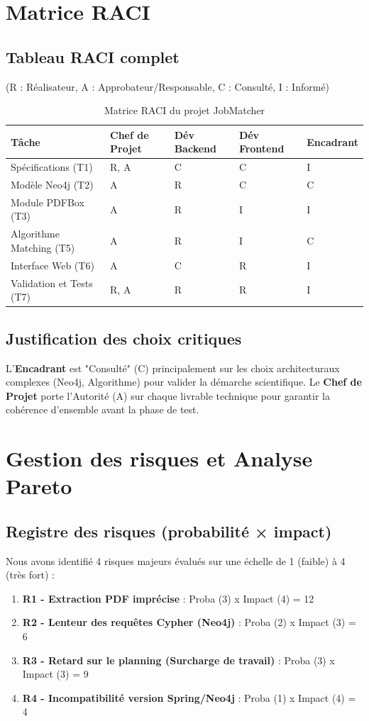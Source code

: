 \documentclass[12pt,a4paper]{report}
\begin{document}
\section{Matrice RACI}

\subsection{Tableau RACI complet}
(R : Réalisateur, A : Approbateur/Responsable, C : Consulté, I : Informé)

\begin{table}[h]
\centering
\begin{tabular}{|p{4cm}|p{2.5cm}|p{2.5cm}|p{2.5cm}|p{2.5cm}|}
\hline
\textbf{Tâche} & \textbf{Chef de Projet} & \textbf{Dév Backend} & \textbf{Dév Frontend} & \textbf{Encadrant} \\
\hline
Spécifications (T1) & R, A & C & C & I \\
\hline
Modèle Neo4j (T2) & A & R & C & C \\
\hline
Module PDFBox (T3) & A & R & I & I \\
\hline
Algorithme Matching (T5) & A & R & I & C \\
\hline
Interface Web (T6) & A & C & R & I \\
\hline
Validation et Tests (T7) & R, A & R & R & I \\
\hline
\end{tabular}
\caption{Matrice RACI du projet JobMatcher}
\end{table}

\subsection{Justification des choix critiques}
L'\textbf{Encadrant} est "Consulté" (C) principalement sur les choix architecturaux complexes (Neo4j, Algorithme) pour valider la démarche scientifique. Le \textbf{Chef de Projet} porte l'Autorité (A) sur chaque livrable technique pour garantir la cohérence d'ensemble avant la phase de test.

\section{Gestion des risques et Analyse Pareto}

\subsection{Registre des risques (probabilité × impact)}
Nous avons identifié 4 risques majeurs évalués sur une échelle de 1 (faible) à 4 (très fort) :
\begin{enumerate}
    \item \textbf{R1 - Extraction PDF imprécise} : Proba (3) x Impact (4) = 12
    \item \textbf{R2 - Lenteur des requêtes Cypher (Neo4j)} : Proba (2) x Impact (3) = 6
    \item \textbf{R3 - Retard sur le planning (Surcharge de travail)} : Proba (3) x Impact (3) = 9
    \item \textbf{R4 - Incompatibilité version Spring/Neo4j} : Proba (1) x Impact (4) = 4
\end{enumerate}
\end{document}
